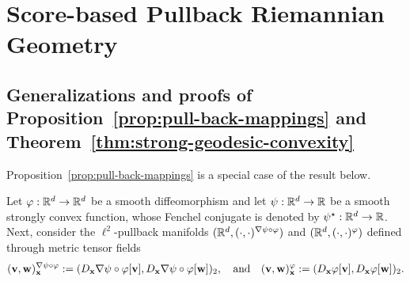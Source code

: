 \chapter{Score-based Pullback Riemannian Geometry}

\section{Generalizations and proofs of Proposition~\ref{prop:pull-back-mappings} and Theorem~\ref{thm:strong-geodesic-convexity}}
\label{app:proof-of-basic-setup}

Proposition~\ref{prop:pull-back-mappings} is a special case of the result below.

\begin{proposition}
    Let $\varphi:\mathbb{R}^d \to \mathbb{R}^d$ be a smooth diffeomorphism and let $\psi: \mathbb{R}^d \to \mathbb{R}$ be a smooth strongly convex function, whose Fenchel conjugate is denoted by $\psi^\star: \mathbb{R}^d\to\mathbb{R}$. Next, consider the $\ell^2$-pullback manifolds $(\mathbb{R}^d, (\cdot,\cdot)^{\nabla \psi \circ \varphi})$ and $(\mathbb{R}^d, (\cdot,\cdot)^{\varphi})$ defined through metric tensor fields
    \begin{equation}
        (\mathbf{v}, \mathbf{w})^{\nabla \psi \circ \varphi}_{\mathbf{x}} 
        := (D_{\mathbf{x}} \nabla \psi \circ \varphi[\mathbf{v}], 
        D_{\mathbf{x}} \nabla \psi \circ \varphi[\mathbf{w}])_2, \quad 
        \text{and} \quad
        (\mathbf{v}, \mathbf{w})^{\varphi}_{\mathbf{x}} 
        := (D_{\mathbf{x}} \varphi[\mathbf{v}], 
        D_{\mathbf{x}} \varphi[\mathbf{w}])_2.
    \end{equation}


\end{proposition}

